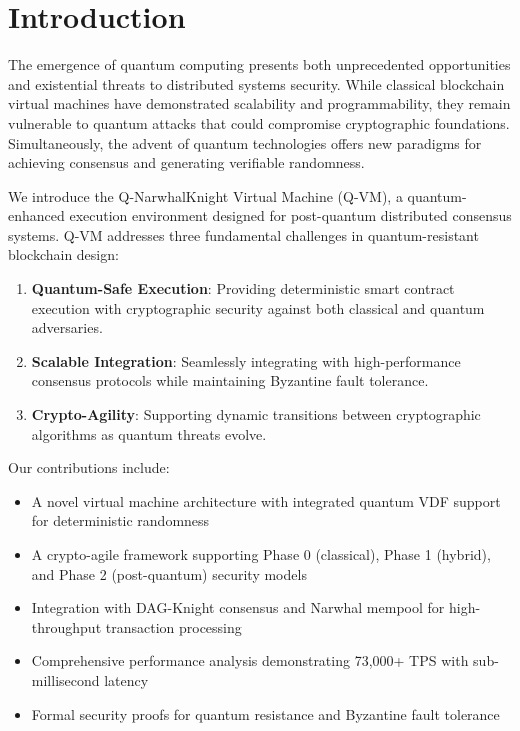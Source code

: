 \documentclass[11pt]{article}
\begin{document}
\tableofcontents
\newpage

\section{Introduction}

The emergence of quantum computing presents both unprecedented opportunities and existential threats to distributed systems security. While classical blockchain virtual machines have demonstrated scalability and programmability, they remain vulnerable to quantum attacks that could compromise cryptographic foundations. Simultaneously, the advent of quantum technologies offers new paradigms for achieving consensus and generating verifiable randomness.

We introduce the Q-NarwhalKnight Virtual Machine (Q-VM), a quantum-enhanced execution environment designed for post-quantum distributed consensus systems. Q-VM addresses three fundamental challenges in quantum-resistant blockchain design:

\begin{enumerate}
    \item \textbf{Quantum-Safe Execution}: Providing deterministic smart contract execution with cryptographic security against both classical and quantum adversaries.
    \item \textbf{Scalable Integration}: Seamlessly integrating with high-performance consensus protocols while maintaining Byzantine fault tolerance.
    \item \textbf{Crypto-Agility}: Supporting dynamic transitions between cryptographic algorithms as quantum threats evolve.
\end{enumerate}

Our contributions include:

\begin{itemize}
    \item A novel virtual machine architecture with integrated quantum VDF support for deterministic randomness
    \item A crypto-agile framework supporting Phase 0 (classical), Phase 1 (hybrid), and Phase 2 (post-quantum) security models
    \item Integration with DAG-Knight consensus and Narwhal mempool for high-throughput transaction processing
    \item Comprehensive performance analysis demonstrating 73,000+ TPS with sub-millisecond latency
    \item Formal security proofs for quantum resistance and Byzantine fault tolerance
\end{itemize}
\end{document}
